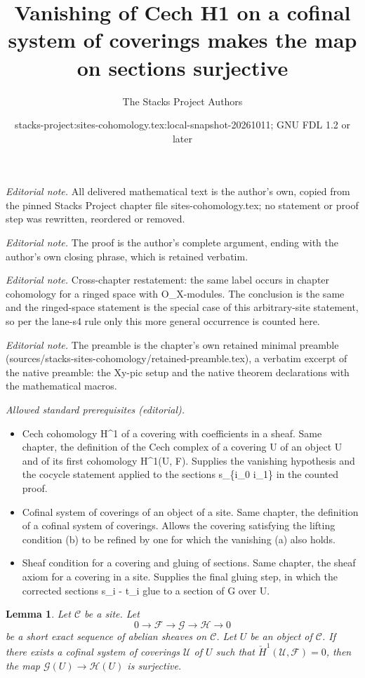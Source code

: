\documentclass[10pt,a4paper]{amsart}
\title{Vanishing of Cech H1 on a cofinal system of coverings makes the map on sections surjective}
\author{The Stacks Project Authors}
\date{stacks-project:sites-cohomology.tex:local-snapshot-20261011; GNU FDL 1.2 or later}
\theoremstyle{plain}
\newtheorem{lemma}[subsection]{Lemma}
\theoremstyle{definition}
\theoremstyle{remark}
\numberwithin{equation}{subsection}
\begin{document}
\maketitle
\noindent\textit{Editorial note.} All delivered mathematical text is the author's own, copied from the pinned Stacks Project chapter file sites-cohomology.tex; no statement or proof step was rewritten, reordered or removed.\par\medskip
\noindent\textit{Editorial note.} The proof is the author's complete argument, ending with the author's own closing phrase, which is retained verbatim.\par\medskip
\noindent\textit{Editorial note.} Cross-chapter restatement: the same label occurs in chapter cohomology for a ringed space with O\_X-modules. The conclusion is the same and the ringed-space statement is the special case of this arbitrary-site statement, so per the lane-s4 rule only this more general occurrence is counted here.\par\medskip
\noindent\textit{Editorial note.} The preamble is the chapter's own retained minimal preamble (sources/stacks-sites-cohomology/retained-preamble.tex), a verbatim excerpt of the native preamble: the Xy-pic setup and the native theorem declarations with the mathematical macros.\par\medskip
\noindent\textit{Allowed standard prerequisites (editorial).}\begin{itemize}
\item Cech cohomology H\textasciicircum{}1 of a covering with coefficients in a sheaf. Same chapter, the definition of the Cech complex of a covering U of an object U and of its first cohomology H\textasciicircum{}1(U, F). Supplies the vanishing hypothesis and the cocycle statement applied to the sections s\_\{i\_0 i\_1\} in the counted proof.
\item Cofinal system of coverings of an object of a site. Same chapter, the definition of a cofinal system of coverings. Allows the covering satisfying the lifting condition (b) to be refined by one for which the vanishing (a) also holds.
\item Sheaf condition for a covering and gluing of sections. Same chapter, the sheaf axiom for a covering in a site. Supplies the final gluing step, in which the corrected sections s\_i - t\_i glue to a section of G over U.
\end{itemize}\medskip
\begin{lemma}
\label{lemma-ses-cech-h1}
Let $\mathcal{C}$ be a site.
Let
$$
0 \to \mathcal{F} \to \mathcal{G} \to \mathcal{H} \to 0
$$
be a short exact sequence of abelian sheaves on $\mathcal{C}$.
Let $U$ be an object of $\mathcal{C}$. If there exists a cofinal system
of coverings $\mathcal{U}$ of $U$ such that
$\check{H}^1(\mathcal{U}, \mathcal{F}) = 0$,
then the map $\mathcal{G}(U) \to \mathcal{H}(U)$ is
surjective.
\end{lemma}
\end{document}
